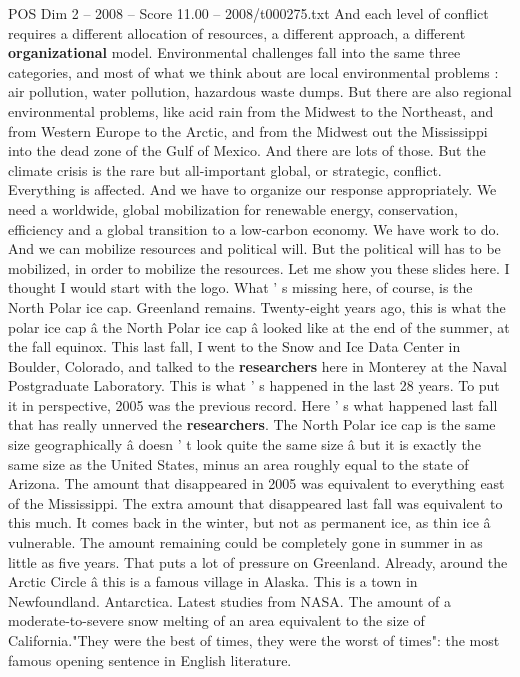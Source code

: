 \begin{textsample}{POS Dim 2 – 2008 – Score 11.00 – 2008/t000275.txt}
And each level of conflict requires a different allocation of resources, a different approach, a different \textbf{organizational} model.
Environmental challenges fall into the same three categories, and most of what we think about are local environmental problems : air pollution, water pollution, hazardous waste dumps.
But there are also regional environmental problems, like acid rain from the Midwest to the Northeast, and from Western Europe to the Arctic, and from the Midwest out the Mississippi into the dead zone of the Gulf of Mexico.
And there are lots of those.
But the climate crisis is the rare but all-important global, or strategic, conflict.
Everything is affected.
And we have to organize our response appropriately.
We need a worldwide, global mobilization for renewable energy, conservation, efficiency and a global transition to a low-carbon economy.
We have work to do.
And we can mobilize resources and political will.
But the political will has to be mobilized, in order to mobilize the resources.
Let me show you these slides here.
I thought I would start with the logo.
What ' s missing here, of course, is the North Polar ice cap.
Greenland remains.
Twenty-eight years ago, this is what the polar ice cap â the North Polar ice cap â looked like at the end of the summer, at the fall equinox.
This last fall, I went to the Snow and Ice Data Center in Boulder, Colorado, and talked to the \textbf{researchers} here in Monterey at the Naval Postgraduate Laboratory.
This is what ' s happened in the last 28 years.
To put it in perspective, 2005 was the previous record.
Here ' s what happened last fall that has really unnerved the \textbf{researchers}.
The North Polar ice cap is the same size geographically â doesn ' t look quite the same size â but it is exactly the same size as the United States, minus an area roughly equal to the state of Arizona.
The amount that disappeared in 2005 was equivalent to everything east of the Mississippi.
The extra amount that disappeared last fall was equivalent to this much.
It comes back in the winter, but not as permanent ice, as thin ice â vulnerable.
The amount remaining could be completely gone in summer in as little as five years.
That puts a lot of pressure on Greenland.
Already, around the Arctic Circle â this is a famous village in Alaska.
This is a town in Newfoundland.
Antarctica.
Latest studies from NASA.
The amount of a moderate-to-severe snow melting of an area equivalent to the size of California."They were the best of times, they were the worst of times": the most famous opening sentence in English literature.

\end{textsample}
